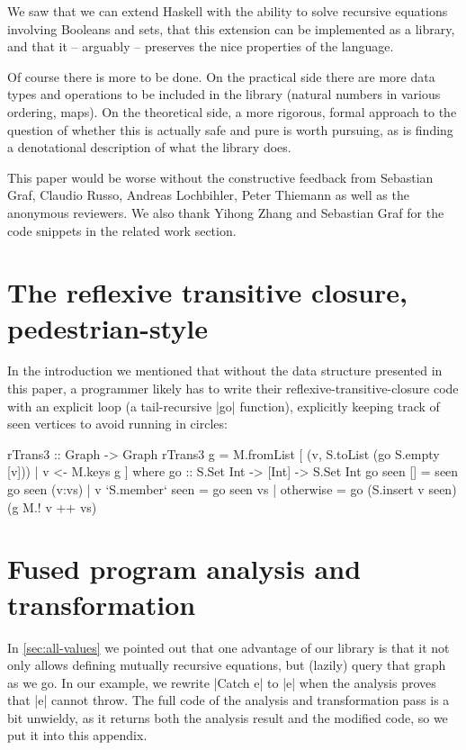 \documentclass[manuscript,screen,acmsmall,nonacm]{acmart}
\begin{document}
We saw that we can extend Haskell with the ability to solve recursive equations involving Booleans and sets, that this extension can be implemented as a library, and that it -- arguably -- preserves the nice properties of the language.

Of course there is more to be done. On the practical side there are more data types and operations to be included in the library (natural numbers in various ordering, maps). On the theoretical side, a more rigorous, formal approach to the question of whether this is actually safe and pure is worth pursuing, as is finding a denotational description of what the library does.

\begin{acks}
This paper would be worse without the constructive feedback from Sebastian Graf, Claudio Russo, Andreas Lochbihler, Peter Thiemann as well as the anonymous reviewers. We also thank Yihong Zhang and Sebastian Graf for the code snippets in the related work section.
\end{acks}


\appendix
\section{The reflexive transitive closure, pedestrian-style}\label{sec:imp}

In the introduction we mentioned that without the data structure presented in this paper, a programmer likely has to write their reflexive-transitive-closure code with an explicit loop (a tail-recursive |go| function), explicitly keeping track of seen vertices to avoid running in circles:
\begin{code}
rTrans3 :: Graph -> Graph
rTrans3 g = M.fromList [ (v, S.toList (go S.empty [v])) | v <- M.keys g ]
  where
    go :: S.Set Int -> [Int] -> S.Set Int
    go seen [] = seen
    go seen (v:vs)  |  v `S.member` seen  =  go seen vs
                    |  otherwise          =  go (S.insert v seen) (g M.! v ++ vs)
\end{code}


\section{Fused program analysis and transformation}\label{sec:proganalexp}

In \cref{sec:all-values} we pointed out that one advantage of our library is that it not only allows defining mutually recursive equations, but (lazily) query that graph as we go. In our example, we rewrite |Catch e| to |e| when the analysis proves that |e| cannot throw. The full code of the analysis and transformation pass is a bit unwieldy, as it returns both the analysis result and the modified code, so we put it into this appendix.
\end{document}
